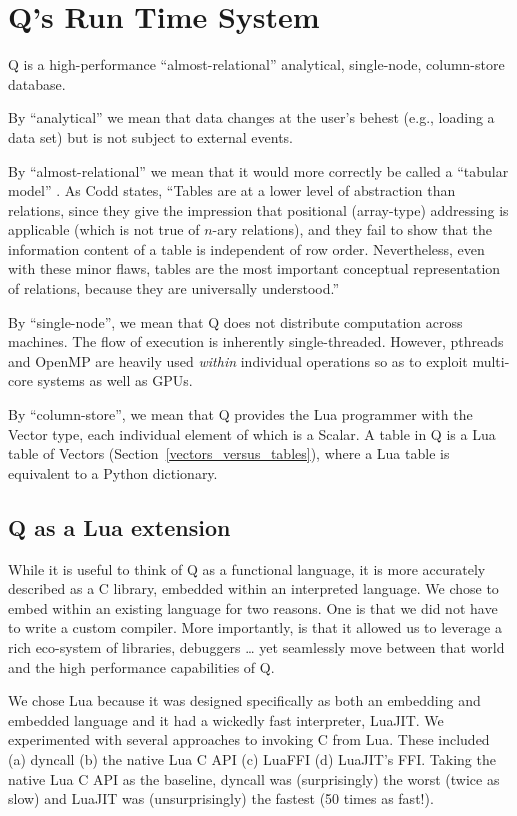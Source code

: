 \section{Q's Run Time System}

Q is a high-performance ``almost-relational'' 
analytical, single-node, column-store database. 
\be
\item 
By ``analytical'' we mean that data changes at the user's behest (e.g.,
loading a data set) but is not subject to external events.
\item 
By ``almost-relational'' we mean that it would more correctly
be called a ``tabular model'' \cite{Codd1982}. As Codd states, ``Tables are
at a lower level of abstraction than relations, since they give
the impression that positional (array-type) addressing is applicable
(which is not true of \(n\)-ary relations), and they fail to
show that the information content of a table is independent
of row order. Nevertheless, even with these minor flaws,
tables are the most important conceptual representation of
relations, because they are universally understood.''
\item By ``single-node'', we mean that Q does not distribute computation across
  machines. The flow of execution is inherently single-threaded. However,
  pthreads and OpenMP are heavily used {\em within} individual operations so as
  to exploit multi-core systems as well as GPUs.
\item By ``column-store'', we mean that 
Q provides the Lua programmer with the Vector type, each
individual element of which is a Scalar. A table in Q is a Lua
table of Vectors (Section~\ref{vectors_versus_tables}), where a Lua table is equivalent
to a Python dictionary.

\ee

\subsection{Q as a Lua extension}

While it is useful to think of Q as a functional language, 
it is more accurately described as a C library, embedded within an interpreted
language.
We chose to embed within an existing language for two reasons. One is that we did not have to
write a custom compiler. More importantly, is that it allowed us to leverage a rich eco-system of libraries, debuggers
\ldots
yet seamlessly move between that world and the high performance capabilities of
Q. 

We chose Lua
because it was designed specifically as both an embedding and embedded language
\cite{Lua2011} and it had a wickedly fast interpreter, LuaJIT.
We experimented with several approaches to invoking C from Lua. These included
(a) dyncall \cite{Adler2013} (b) the native Lua C API (c) LuaFFI (d) LuaJIT's
FFI. Taking the native Lua C API as the baseline, dyncall was (surprisingly) the worst (twice
as slow) and LuaJIT was (unsurprisingly) the fastest (50 times as fast!).

